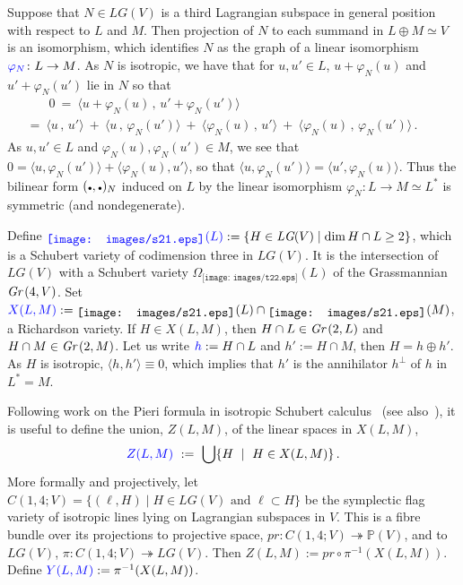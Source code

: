 \documentclass[12pt]{amsart}
\theoremstyle{remark}
\newcommand{\Gr}{\textit{Gr\,}}
\newcommand{\LG}{\textit{LG}}
\newcommand{\pr}{\textit{pr}}
\newcommand{\PP}{{\mathbb P}}
\newcommand{\ndot}{\mbox{{\tiny$\bullet$}}}
\newcommand{\sTI}{\texttt{[image: images/s21.eps]}}
\newcommand{\schTI}{\raisebox{-2pt}{\sTI\hspace{.5pt}}}
\newcommand{\tTT}{\texttt{[image: images/t22.eps]}}
\newcommand{\defcolor}[1]{{\color{blue}#1}}
\begin{document}
Suppose that $N\in\LG(V)$ is a third Lagrangian subspace in general position with respect to $L$ and $M$.
Then projection of $N$ to each summand in $L\oplus M\simeq V$ is an isomorphism, which identifies $N$ as the graph of a linear isomorphism
$\defcolor{\varphi_N}\colon L\to M$.
As $N$ is isotropic, we have that for $u,u'\in L$, $u+\varphi_N(u)$ and $u'+\varphi_N(u')$ lie in $N$ so that
%
 \begin{multline*}
   \qquad 0\ =\  \langle u+\varphi_N(u)\,,\, u'+\varphi_N(u')\rangle
   \\
    \ =\
    \langle u\,,\,u' \rangle \ +\ 
    \langle u\,,\,\varphi_N(u') \rangle  \ +\ 
    \langle \varphi_N(u)\,,\,u' \rangle \ +\ 
    \langle \varphi_N(u)\,,\,\varphi_N(u') \rangle\,. \qquad
 \end{multline*}
%
 As $u,u'\in L$ and $\varphi_N(u),\varphi_N(u')\in M$, we see that 
 $0 = \langle u,\varphi_N(u') \rangle   + \langle \varphi_N(u),u' \rangle$,
 so that $\langle u,\varphi_N(u') \rangle =\langle u',\varphi_N(u) \rangle$.
 Thus the bilinear form $(\ndot,\ndot)_N$ induced on $L$ by the linear isomorphism $\varphi_N\colon L\to M\simeq L^*$ is symmetric (and
 nondegenerate). 


Define $\defcolor{\schTI(L)}:=\{H\in\LG(V)\mid \dim H\cap L\geq 2\}$, which is a Schubert variety of codimension three in $\LG(V)$.
It is the intersection of $\LG(V)$ with a Schubert variety $\Omega_{\tTT}(L)$  of the Grassmannian $\Gr(4,V)$.
Set $\defcolor{X(L,M)}:=\schTI(L)\cap\schTI(M)$, a Richardson variety.
If $H\in X(L,M)$, then $H\cap L\in\Gr(2,L)$ and  $H\cap M\in\Gr(2,M)$.
Let us write $\defcolor{h}:=H\cap L$ and $h':=H\cap M$, then $H=h\oplus h'$.
As $H$ is isotropic, $\langle h,h'\rangle\equiv 0$, which implies that $h'$ is the annihilator \defcolor{$h^\perp$} of $h$ in $L^*=M$.

Following work on the Pieri formula in isotropic Schubert calculus~\cite{MaxPieri} (see also~\cite{EPieri}), 
it is useful to define the union, $Z(L,M)$, of the linear spaces in $X(L,M)$,
\[
\defcolor{Z(L,M)}\ :=\  \bigcup\{ H\ \mid\ H\in X(L,M)\}\,.
\]
More formally and projectively, let $C(1,4;V)=\{(\ell,H)\mid H\in\LG(V)\mbox{ and }\ell\subset H\}$ be the symplectic flag variety of
isotropic lines lying on Lagrangian subspaces in $V$.
This is a fibre bundle over its projections to projective space, $\pr\colon C(1,4;V)\twoheadrightarrow\PP(V)$, and to $LG(V)$,
$\pi\colon C(1,4;V)\twoheadrightarrow\LG(V)$.
Then $Z(L,M):=\pr\circ\pi^{-1}(X(L,M))$.
Define $\defcolor{Y(L,M)}:=\pi^{-1}(X(L,M))$.
\end{document}
